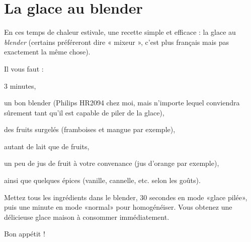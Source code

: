 \section{La glace au blender}

En ces temps de chaleur estivale, une recette simple et efficace : la glace au
\textit{blender} (certains préféreront dire « mixeur », c’est plus français
mais pas exactement la même chose).

Il vous faut :
\begin{ingredients}
	\item 3 minutes,
	\item un bon blender (Philips HR2094 chez moi, mais n’importe lequel
	conviendra sûrement tant qu’il est capable de piler de la glace),
	\item des fruits surgelés (framboises et mangue par exemple),
	\item autant de lait que de fruits,
	\item un peu de jus de fruit à votre convenance (jus d’orange par exemple),
	\item ainsi que quelques épices (vanille, cannelle, etc. selon les goûts).
\end{ingredients}

\begin{instructions}

	\item Mettez tous les ingrédients dans le blender, 30 secondes en mode
	«glace pilée», puis une minute en mode «normal» pour homogénéiser. Vous
	obtenez une délicieuse glace maison à consommer immédiatement.

\end{instructions}

Bon appétit !